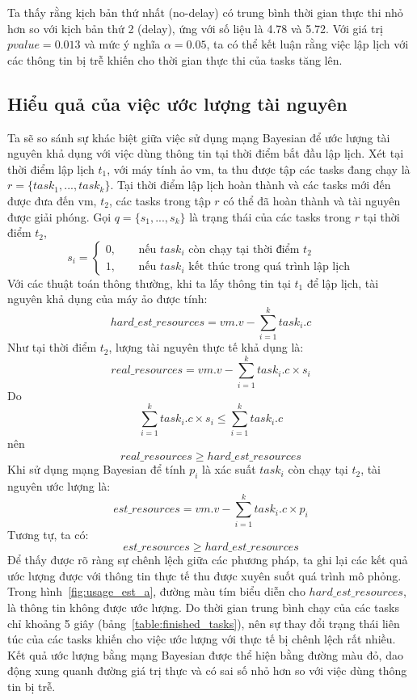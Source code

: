 \documentclass{my_style}
\begin{document}
\noindent
Ta thấy rằng kịch bản thứ nhất (no-delay) có trung bình thời gian thực thi nhỏ hơn so với kịch bản thứ 2 (delay), ứng với số liệu là 4.78 và 5.72. Với giá trị $pvalue = 0.013$ và mức ý nghĩa $\alpha = 0.05$, ta có thể kết luận rằng việc lập lịch với các thông tin bị trễ khiến cho thời gian thực thi của tasks tăng lên. 

\subsection{Hiểu quả của việc ước lượng tài nguyên}
Ta sẽ so sánh sự khác biệt giữa việc sử dụng mạng Bayesian để ước lượng tài nguyên khả dụng với việc dùng thông tin tại thời điểm bắt đầu lập lịch. Xét tại thời điểm lập lịch $t_{1}$, với máy tính ảo vm, ta thu được tập các tasks đang chạy là $r = \{task_{1}, ..., task_{k}\}$. Tại thời điểm lập lịch hoàn thành và các tasks mới đến được đưa đến vm, $t_{2}$, các tasks trong tập $r$ có thể đã hoàn thành và tài nguyên được giải phóng. Gọi $q = \{s_{1}, ..., s_{k}\}$ là trạng thái của các tasks trong $r$ tại thời điểm $t_{2}$, 
\[
s_{i} = 
	\begin{cases}
		\text{0, } &\quad\text{nếu $task_{i}$ còn chạy tại thời điểm $t_{2}$} \\
		\text{1, } &\quad\text{nếu $task_{i}$ kết thúc trong quá trình lập lịch}
	\end{cases}
\]
Với các thuật toán thông thường, khi ta lấy thông tin tại $t_{1}$ để lập lịch, tài nguyên khả dụng của máy ảo được tính: 
\[
	hard\_est\_resources = vm.v - \sum_{i = 1}^{k}task_{i}.c
\]
Như tại thời điểm $t_{2}$, lượng tài nguyên thực tế khả dụng là: 
\[
	real\_resources = vm.v - \sum_{i = 1}^{k}task_{i}.c \times s_{i}
\]
Do 
\[
	\sum_{i = 1}^{k}task_{i}.c \times s_{i} \leq \sum_{i = 1}^{k}task_{i}.c
\]
nên 
\[
	real\_resources \geq hard\_est\_resources
\]
Khi sử dụng mạng Bayesian để tính $p_{i}$ là xác suất $task_{i}$ còn chạy tại $t_{2}$, tài nguyên ước lượng là: 
\[
	est\_resources = vm.v - \sum_{i = 1}^{k}task_{i}.c \times p_{i}
\]
Tương tự, ta có:
\[
	est\_resources \geq hard\_est\_resources
\]
Để thấy được rõ ràng sự chênh lệch giữa các phương pháp, ta ghi lại các kết quả ước lượng được với thông tin thực tế thu được xuyên suốt quá trình mô phỏng.
Trong hình~\ref{fig:usage_est_a}, đường màu tím biểu diễn cho $hard\_est\_resources$, là thông tin không được ước lượng. Do thời gian trung bình chạy của các tasks chỉ khoảng 5 giây (bảng~\ref{table:finished_tasks}), nên sự thay đổi trạng thái liên túc của các tasks khiến cho việc ước lượng với thực tế bị chênh lệch rất nhiều. Kết quả ước lượng bằng mạng Bayesian được thể hiện bằng đường màu đỏ, dao động xung quanh đường giá trị thực và có sai số nhỏ hơn so với việc dùng thông tin bị trễ. 
\end{document}
